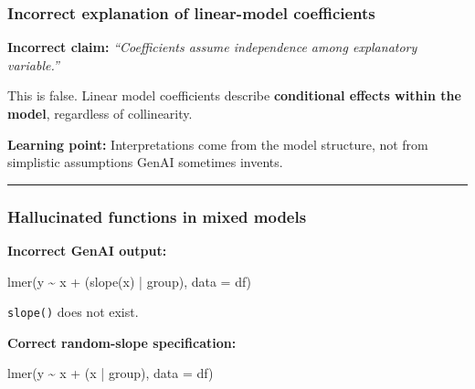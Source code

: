 \documentclass[
  letterpaper,
  8pt,
  a4paper]{book}
\newenvironment{Shaded}{\begin{snugshade}}{\end{snugshade}}
\newcommand{\AttributeTok}[1]{\textcolor[rgb]{0.40,0.45,0.13}{#1}}
\newcommand{\FunctionTok}[1]{\textcolor[rgb]{0.28,0.35,0.67}{#1}}
\newcommand{\NormalTok}[1]{\textcolor[rgb]{0.00,0.23,0.31}{#1}}
\newcommand{\SpecialCharTok}[1]{\textcolor[rgb]{0.37,0.37,0.37}{#1}}
\begin{document}
\subsubsection*{Incorrect explanation of linear-model
coefficients}\label{incorrect-explanation-of-linear-model-coefficients}

\textbf{Incorrect claim:} \emph{``Coefficients assume independence among
explanatory variable.''}

This is false. Linear model coefficients describe \textbf{conditional
effects within the model}, regardless of collinearity.

\textbf{Learning point:} Interpretations come from the model structure,
not from simplistic assumptions GenAI sometimes invents.

\begin{center}\rule{0.5\linewidth}{0.5pt}\end{center}

\subsubsection*{Hallucinated functions in mixed
models}\label{hallucinated-functions-in-mixed-models}

\textbf{Incorrect GenAI output:}

\begin{Shaded}
\begin{Highlighting}[]
\FunctionTok{lmer}\NormalTok{(y }\SpecialCharTok{\textasciitilde{}}\NormalTok{ x }\SpecialCharTok{+}\NormalTok{ (}\FunctionTok{slope}\NormalTok{(x) }\SpecialCharTok{|}\NormalTok{ group), }\AttributeTok{data =}\NormalTok{ df)}
\end{Highlighting}
\end{Shaded}

\texttt{slope()} does not exist.

\textbf{Correct random-slope specification:}

\begin{Shaded}
\begin{Highlighting}[]
\FunctionTok{lmer}\NormalTok{(y }\SpecialCharTok{\textasciitilde{}}\NormalTok{ x }\SpecialCharTok{+}\NormalTok{ (x }\SpecialCharTok{|}\NormalTok{ group), }\AttributeTok{data =}\NormalTok{ df)}
\end{Highlighting}
\end{Shaded}
\end{document}
